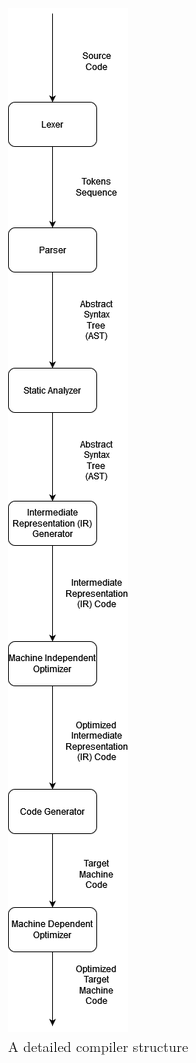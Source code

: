 \begin{figure}[H]  
  \centering
  \includegraphics[width=\textwidth, height=0.8\textheight, keepaspectratio]{Figures/Arquiteturas/CompilersDetailedPipeline.png}  
  \caption{A detailed compiler structure}
  \label{fig:comp}
\end{figure}


